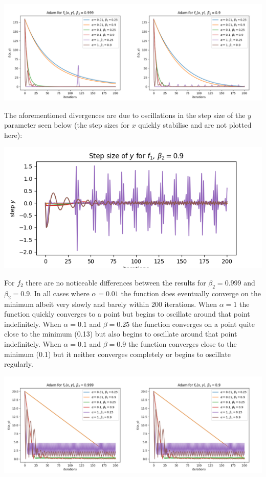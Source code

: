 \documentclass[12pt]{article}
\begin{document}
\begin{center}
    \includegraphics[scale=1.6]{figs/b/b_iii_1.png}
\end{center}

The aforementioned divergences are due to oscillations in the step size of the $y$ parameter seen below (the step sizes for $x$ quickly stabilise and are not plotted here):

\begin{center}
    \includegraphics[scale=0.6]{figs/b/b_iii_stepy_f1.png}
\end{center}

For $f_2$ there are no noticeable differences between the results for $\beta_2=0.999$ and $\beta_2=0.9$. In all cases where $\alpha=0.01$ the function does eventually converge on the minimum albeit very slowly and barely within 200 iterations. When $\alpha=1$ the function quickly converges to a point but begins to oscillate around that point indefinitely. When $\alpha=0.1$ and $\beta=0.25$ the function converges on a point quite close to the minimum (0.13) but also begins to oscillate around that point indefinitely. When $\alpha=0.1$ and $\beta=0.9$ the function converges close to the minimum (0.1) but it neither converges completely or begins to oscillate regularly.

\begin{center}
    \includegraphics[scale=1.6]{figs/b/b_iii_2.png}
\end{center}
\end{document}
